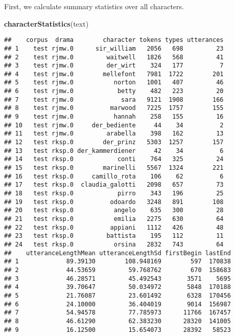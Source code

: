 \documentclass[]{book}
\newenvironment{Shaded}{\begin{snugshade}}{\end{snugshade}}
\newcommand{\KeywordTok}[1]{\textcolor[rgb]{0.13,0.29,0.53}{\textbf{#1}}}
\newcommand{\NormalTok}[1]{#1}
\begin{document}
First, we calculate summary statistics over all characters.

\begin{Shaded}
\begin{Highlighting}[]
\KeywordTok{characterStatistics}\NormalTok{(text)}
\end{Highlighting}
\end{Shaded}

\begin{verbatim}
##    corpus  drama        character tokens types utterances
## 1    test rjmw.0      sir_william   2056   698         23
## 2    test rjmw.0         waitwell   1826   568         41
## 3    test rjmw.0         der_wirt    324   177          7
## 4    test rjmw.0        mellefont   7981  1722        201
## 5    test rjmw.0           norton   1001   407         46
## 6    test rjmw.0            betty    482   223         20
## 7    test rjmw.0             sara   9121  1908        166
## 8    test rjmw.0          marwood   7225  1757        155
## 9    test rjmw.0           hannah    258   155         16
## 10   test rjmw.0     der_bediente     44    34          2
## 11   test rjmw.0         arabella    398   162         13
## 12   test rksp.0        der_prinz   5303  1257        157
## 13   test rksp.0 der_kammerdiener     42    34          6
## 14   test rksp.0            conti    764   325         24
## 15   test rksp.0        marinelli   5567  1324        221
## 16   test rksp.0     camillo_rota    106    62          6
## 17   test rksp.0  claudia_galotti   2098   657         73
## 18   test rksp.0            pirro    343   196         25
## 19   test rksp.0          odoardo   3248   891        108
## 20   test rksp.0           angelo    635   300         28
## 21   test rksp.0           emilia   2275   630         64
## 22   test rksp.0          appiani   1112   426         48
## 23   test rksp.0         battista    195   112         11
## 24   test rksp.0           orsina   2832   743         64
##    utteranceLengthMean utteranceLengthSd firstBegin lastEnd
## 1             89.39130        108.948169        597  170838
## 2             44.53659         59.768762        670  158683
## 3             46.28571         45.492543       3571    5695
## 4             39.70647         50.034972       5848  170188
## 5             21.76087         23.601492       6328  170456
## 6             24.10000         36.404019       9014  156987
## 7             54.94578         77.785973      11766  167457
## 8             46.61290         62.383230      28320  141005
## 9             16.12500         15.654073      28392   58523

\end{verbatim}
\end{document}
